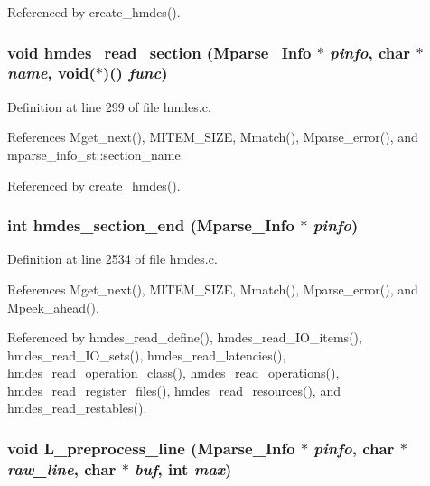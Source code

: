 Referenced by create\_\-hmdes().
\subsubsection{\setlength{\rightskip}{0pt plus 5cm}void hmdes\_\-read\_\-section (\bf{Mparse\_\-Info} $\ast$ {\em pinfo}, char $\ast$ {\em name}, void($\ast$)() {\em func})}\label{hmdes_8c_f122d4b6dad387d560f2445048d82f3f}




Definition at line 299 of file hmdes.c.

References Mget\_\-next(), MITEM\_\-SIZE, Mmatch(), Mparse\_\-error(), and mparse\_\-info\_\-st::section\_\-name.

Referenced by create\_\-hmdes().
\subsubsection{\setlength{\rightskip}{0pt plus 5cm}int hmdes\_\-section\_\-end (\bf{Mparse\_\-Info} $\ast$ {\em pinfo})}\label{hmdes_8c_169537c1ae702279208ac7b91eb1869b}




Definition at line 2534 of file hmdes.c.

References Mget\_\-next(), MITEM\_\-SIZE, Mmatch(), Mparse\_\-error(), and Mpeek\_\-ahead().

Referenced by hmdes\_\-read\_\-define(), hmdes\_\-read\_\-IO\_\-items(), hmdes\_\-read\_\-IO\_\-sets(), hmdes\_\-read\_\-latencies(), hmdes\_\-read\_\-operation\_\-class(), hmdes\_\-read\_\-operations(), hmdes\_\-read\_\-register\_\-files(), hmdes\_\-read\_\-resources(), and hmdes\_\-read\_\-restables().
\subsubsection{\setlength{\rightskip}{0pt plus 5cm}void L\_\-preprocess\_\-line (\bf{Mparse\_\-Info} $\ast$ {\em pinfo}, char $\ast$ {\em raw\_\-line}, char $\ast$ {\em buf}, int {\em max})}\label{hmdes_8c_9044d5ee723efcef9552470226662186}




